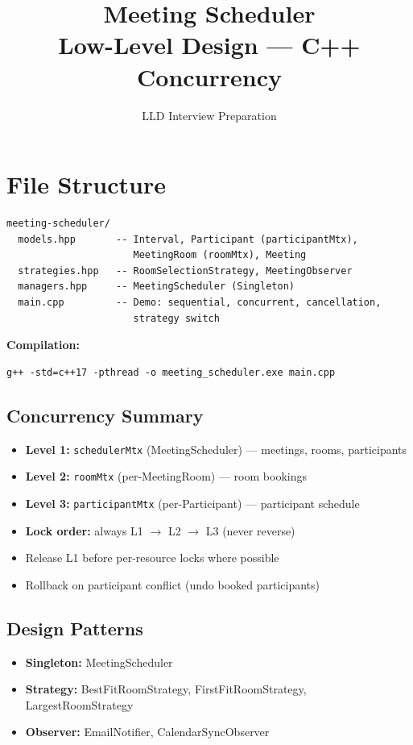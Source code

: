 \documentclass[11pt,a4paper]{article}
\title{\Huge\textbf{Meeting Scheduler}\\[0.3em]\Large Low-Level Design --- C++ Concurrency}
\author{LLD Interview Preparation}
\date{}
\begin{document}
\maketitle
\tableofcontents
\newpage

\section{File Structure}
\begin{verbatim}
meeting-scheduler/
  models.hpp       -- Interval, Participant (participantMtx),
                      MeetingRoom (roomMtx), Meeting
  strategies.hpp   -- RoomSelectionStrategy, MeetingObserver
  managers.hpp     -- MeetingScheduler (Singleton)
  main.cpp         -- Demo: sequential, concurrent, cancellation,
                      strategy switch
\end{verbatim}

\textbf{Compilation:}
\begin{verbatim}
g++ -std=c++17 -pthread -o meeting_scheduler.exe main.cpp
\end{verbatim}

\subsection{Concurrency Summary}
\begin{itemize}
    \item \textbf{Level 1:} \texttt{schedulerMtx} (MeetingScheduler) --- meetings, rooms, participants
    \item \textbf{Level 2:} \texttt{roomMtx} (per-MeetingRoom) --- room bookings
    \item \textbf{Level 3:} \texttt{participantMtx} (per-Participant) --- participant schedule
    \item \textbf{Lock order:} always L1 $\rightarrow$ L2 $\rightarrow$ L3 (never reverse)
    \item Release L1 before per-resource locks where possible
    \item Rollback on participant conflict (undo booked participants)
\end{itemize}

\subsection{Design Patterns}
\begin{itemize}
    \item \textbf{Singleton:} MeetingScheduler
    \item \textbf{Strategy:} BestFitRoomStrategy, FirstFitRoomStrategy, LargestRoomStrategy
    \item \textbf{Observer:} EmailNotifier, CalendarSyncObserver
\end{itemize}
\end{document}
